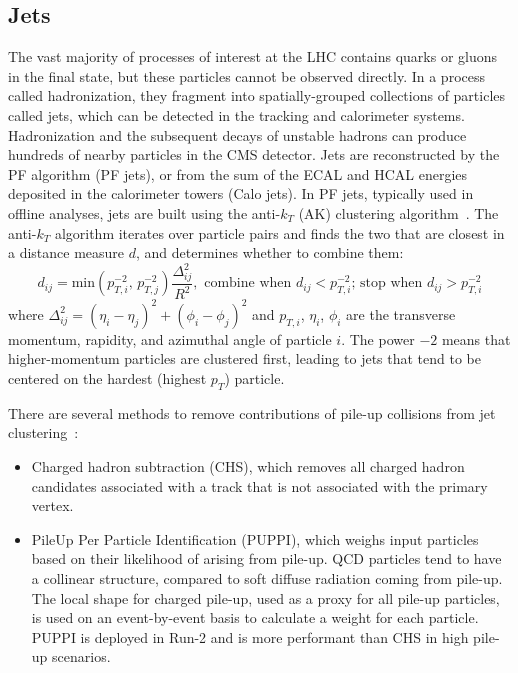 \subsection{Jets}
The vast majority of processes of interest at the LHC contains quarks or gluons in the final state, but these particles cannot be observed directly. In a process called hadronization, they fragment into spatially-grouped collections of particles called jets, which can be detected in the tracking and calorimeter systems. Hadronization and the subsequent decays of unstable hadrons can produce hundreds of nearby particles in the CMS detector. Jets are reconstructed by the PF algorithm (PF jets), or from the sum of the ECAL and HCAL energies deposited in the calorimeter towers (Calo jets). In PF jets, typically used in offline analyses, jets are built using the anti-$k_T$ (AK) clustering algorithm~\cite{CMS-BTV-12-001}. The anti-$k_T$ algorithm iterates over particle pairs and finds the two that are closest in a distance measure $d$, and determines whether to combine them:
\begin{equation}
    d_{ij} = \text{min} \left(p_{T, i}^{-2}, \, p_{T, j}^{-2} \right) \frac{\Delta_{ij}^2}{R^2}, \, \,
    \text{combine when $d_{ij} < p_{T,i}^{-2}$; stop when $d_{ij} > p_{T, i}^{-2}$}
    \label{eqn:anti-kT}
\end{equation}
where $\Delta_{ij}^2 = (\eta_i - \eta_j)^2 + (\phi_i - \phi_j)^2$ and $p_{T, i}$, $\eta_i$, $\phi_i$ are the transverse momentum, rapidity, and azimuthal angle of particle $i$. The power $-2$ means that higher-momentum particles are clustered first, leading to jets that tend to be centered on the hardest (highest $p_T$) particle.

There are several methods to remove contributions of pile-up collisions from jet clustering~\cite{CMS-PAS-JME-14-001}:
\begin{itemize}
    \item Charged hadron subtraction (CHS), which removes all charged hadron candidates associated with a track that is not associated with the primary vertex.
    \item PileUp Per Particle Identification (PUPPI), which weighs input particles based on their likelihood of arising from pile-up. QCD particles tend to have a collinear structure, compared to soft diffuse radiation coming from pile-up. The local shape for charged pile-up, used as a proxy for all pile-up particles, is used on an event-by-event basis to calculate a weight for each particle. PUPPI is deployed in Run-2 and is more performant than CHS in high pile-up scenarios.
\end{itemize}


